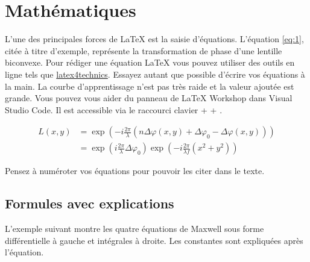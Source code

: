 \section{Mathématiques}

L'une des principales forces de \LaTeX{} est la saisie d'équations. L'équation \ref{eq:1}, citée à titre d'exemple, représente la transformation de phase d'une lentille biconvexe. Pour rédiger une équation \LaTeX{} vous pouvez utiliser des outils en ligne tels que \href{https://www.latex4technics.com/}{latex4technics}. Essayez autant que possible d'écrire vos équations à la main.
La courbe d'apprentissage n'est pas très raide et la valeur ajoutée est grande. Vous pouvez vous aider du panneau de \LaTeX{} Workshop dans Visual Studio Code. Il est accessible via le raccourci clavier  +  + .

\begin{equation} \label{eq:1}
    \begin{split}
        L(x,y) & = \exp\left( - i\frac{{2\pi }}{\lambda }\left( {n\Delta \varphi (x,y) + \Delta {\varphi _0} - \Delta \varphi (x,y)} \right)\right)     \\
               & = {\exp\left({i\frac{{2\pi }}{\lambda }\Delta {\varphi _0}}\right)}{\exp\left({ - i\frac{{2\pi }}{{\lambda f}}({x^2} + {y^2})}\right)}
    \end{split}
\end{equation}

Pensez à numéroter vos équations pour pouvoir les citer dans le texte.

\subsection{Formules avec explications}

L'exemple suivant montre les quatre équations de Maxwell sous forme différentielle à gauche et intégrales à droite. Les constantes sont expliquées après l'équation.

